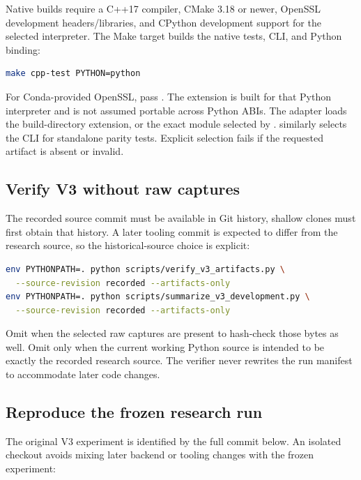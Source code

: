 Native builds require a C++17 compiler, CMake 3.18 or newer, OpenSSL development
headers/libraries, and CPython development support for the selected
interpreter. The Make target builds the native tests, CLI, and Python binding:

\begin{lstlisting}[language=bash]
make cpp-test PYTHON=python
\end{lstlisting}

For Conda-provided OpenSSL, pass
. The extension is built
for that Python interpreter and is not assumed portable across Python ABIs.
The adapter loads the build-directory extension, or the exact module selected
by .  similarly selects the CLI
for standalone parity tests. Explicit selection fails if the requested
artifact is absent or invalid.

\subsection{Verify V3 without raw captures}

The recorded source commit must be available in Git history, shallow clones
must first obtain that history. A later tooling commit is expected to differ
from the research source, so the historical-source choice is explicit:

\begin{lstlisting}[language=bash]
env PYTHONPATH=. python scripts/verify_v3_artifacts.py \
  --source-revision recorded --artifacts-only
env PYTHONPATH=. python scripts/summarize_v3_development.py \
  --source-revision recorded --artifacts-only
\end{lstlisting}

Omit  when the selected raw captures are present to
hash-check those bytes as well. Omit  only when the
current working Python source is intended to be exactly the recorded research
source. The verifier never rewrites the run manifest to accommodate later
code changes.

\subsection{Reproduce the frozen research run}

The original V3 experiment is identified by the full commit below. An isolated
checkout avoids mixing later backend or tooling changes with the frozen
experiment:

